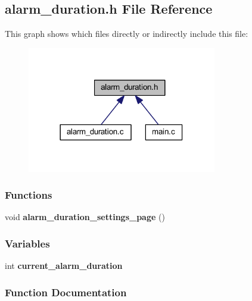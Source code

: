 \subsection{alarm\+\_\+duration.\+h File Reference}
\label{a00005}
This graph shows which files directly or indirectly include this file\+:
\nopagebreak
\begin{figure}[H]
\begin{center}
\leavevmode
\includegraphics[width=234pt]{a00007}
\end{center}
\end{figure}
\subsubsection*{Functions}
\begin{DoxyCompactItemize}
\item 
void \textbf{ alarm\+\_\+duration\+\_\+settings\+\_\+page} ()
\end{DoxyCompactItemize}
\subsubsection*{Variables}
\begin{DoxyCompactItemize}
\item 
int \textbf{ current\+\_\+alarm\+\_\+duration}
\end{DoxyCompactItemize}


\subsubsection{Function Documentation}
\mbox{\label{a00005_adc10f1c6bb2de8f4dd4d65901c941c0f}} 

